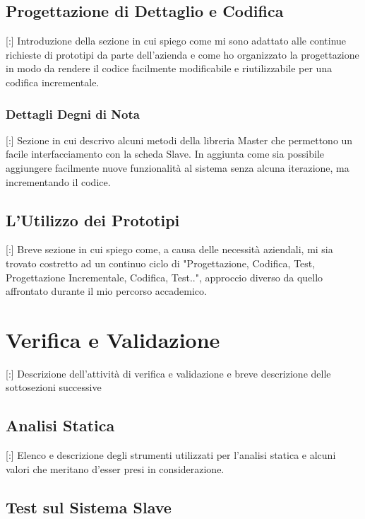 \subsection{Progettazione di Dettaglio e Codifica}

[:] Introduzione della sezione in cui spiego come mi sono adattato alle continue richieste di prototipi da parte dell'azienda e come ho organizzato la progettazione in modo da rendere il codice facilmente modificabile e riutilizzabile per una codifica incrementale.

\subsubsection{Dettagli Degni di Nota}

[:] Sezione in cui descrivo alcuni metodi della libreria Master che permettono un facile interfacciamento con la scheda Slave. In aggiunta come sia possibile aggiungere facilmente nuove funzionalità al sistema senza alcuna iterazione, ma incrementando il codice.

\subsection{L'Utilizzo dei Prototipi}

[:] Breve sezione in cui spiego come, a causa delle necessità aziendali, mi sia trovato costretto ad un continuo ciclo di "Progettazione, Codifica, Test, Progettazione Incrementale, Codifica, Test..", approccio diverso da quello affrontato durante il mio percorso accademico.

\section{Verifica e Validazione}

[:] Descrizione dell'attività di verifica e validazione e breve descrizione delle sottosezioni successive

\subsection{Analisi Statica}

[:] Elenco e descrizione degli strumenti utilizzati per l'analisi statica e alcuni valori che meritano d'esser presi in considerazione.

\subsection{Test sul Sistema Slave}

